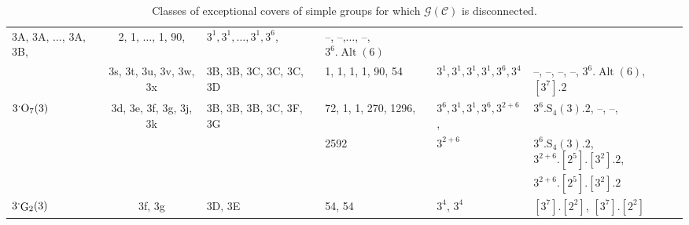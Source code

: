 \documentclass[11pt,a4paper]{amsart}
\theoremstyle{plain}
\theoremstyle{definition}
\theoremstyle{remark}
\theoremstyle{remark}
\theoremstyle{remark}
\theoremstyle{definition}
\newcommand{\ns}{\mathbin{\mspace{-4mu}\vcenter{\hbox{\raisebox{1ex}{$\cdot$}}}\mspace{-4mu}}}
\newcommand{\GG}{\mathcal{G}}
\DeclareMathOperator{\G}{G}
\DeclareMathOperator{\Alt}{Alt}
\begin{document}
\begin{table}
\begin{tabular}{|l|c|l|l|l|l|}
3A, 3A, $\dots$, 3A, 3B,
& 2, 1, $\dots$, 1, 90,
& $3^1,3^1,\dots,3^1,3^6$,&--, --,$\dots$, --, $3^6.\Alt(6)$\\
&3s, 3t, 3u, 3v, 3w, 3x &
3B, 3B, 3C, 3C, 3C, 3D &
1, 1, 1, 1, 90, 54 &
$3^1,3^1,3^1,3^1,3^6,3^4$ &--, --, --, --, $3^6.\Alt(6)$, $[3^7].2$\\\hline
$3\ns\mathrm{O}_7(3)$            & 3d, 3e, 3f, 3g, 3j, 3k     & 3B, 3B, 3B, 3C, 3F, 3G                          & 72, 1, 1, 270, 1296,                & $3^6, 3^1, 3^1, 3^6, 3^{2+6}$,       & $3^6.\mathrm{S}_4(3).2$, --, --,\\&& &2592&$ 3^{2+6}$& $3^6.\mathrm{S}_4(3).2$, $3^{2+6}.[2^5].[3^2].2$,\\&&&&& $3^{2+6}.[2^5].[3^2].2$   \\\hline
$3\ns\G_2(3)$            & 3f, 3g                                          & 3D, 3E                                          & 54, 54                                       & $3^4$, $3^4$& $[3^7].[2^2]$, $[3^7].[2^2]$\\\hline
\end{tabular}
\caption{Classes of exceptional covers of simple groups for which $\GG(\mathcal{C})$ is disconnected.}
\label{tbl:exco}

\end{table}



\end{document}
